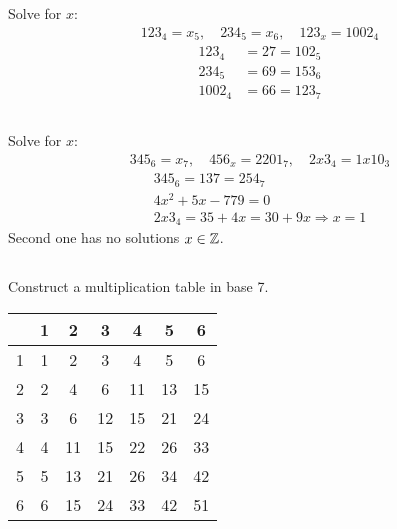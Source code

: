 \documentclass{article} \usepackage{amsmath}
\begin{document}
\subsection{}
Solve for $x$:
\begin{gather*}
    123_4 = x_5, \quad 234_5 = x_6, \quad 123_x = 1002_4
\end{gather*}
\begin{align*}
    123_4 &= 27 = 102_5\\
    234_5 &= 69 = 153_6\\
    1002_4 &= 66 = 123_7
\end{align*}

\subsection{}
Solve for $x$:
\begin{gather*}
    345_6 = x_7, \quad 456_x = 2201_7, \quad 2x3_4 = 1x10_3
\end{gather*}
\begin{gather*}
    345_6 = 137 = 254_7\\
    4x^2 + 5x - 779 = 0\\
    2x3_4 = 35 + 4x = 30 + 9x \Rightarrow x = 1
\end{gather*}
Second one has no solutions $x \in \mathbb{Z}$.

\subsection{}
Construct a multiplication table in base 7.
\begin{center}
\begin{tabular}{ c|c c c c c c }
    & 1 & 2 & 3 & 4 & 5 & 6 \\ 
    \hline
    1 & 1 & 2  & 3  & 4  & 5  & 6 \\ 
    2 & 2 & 4  & 6  & 11 & 13 & 15 \\ 
    3 & 3 & 6  & 12 & 15 & 21 & 24 \\ 
    4 & 4 & 11 & 15 & 22 & 26 & 33 \\ 
    5 & 5 & 13 & 21 & 26 & 34 & 42 \\ 
    6 & 6 & 15 & 24 & 33 & 42 & 51 
\end{tabular}
\end{center}

\end{document}
